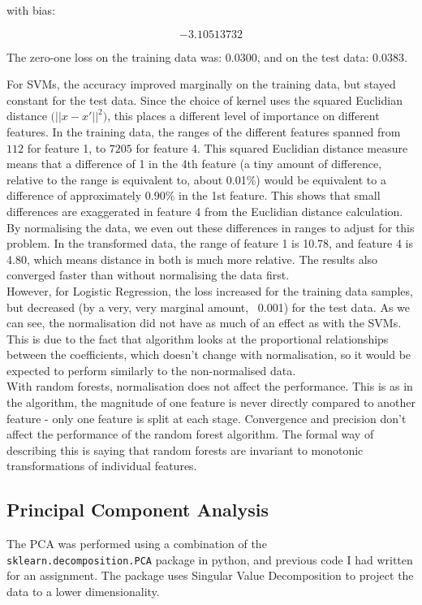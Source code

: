 \documentclass{scrartcl}
\begin{document}
with bias:

\[ -3.10513732 \]

The zero-one loss on the training data was: $0.0300$, and on the test data: $0.0383$.

For SVMs, the accuracy improved marginally on the training data, but stayed constant for the test data. Since the choice of kernel uses the squared Euclidian distance $\big( || x - x' || ^2 \big)$, this places a different level of importance on different features. In the training data, the ranges of the different features spanned from $112$ for feature 1, to $7205$ for feature 4. This squared Euclidian distance measure means that a difference of 1 in the 4th feature (a tiny amount of difference, relative to the range is equivalent to, about 0.01\%) would be equivalent to a difference of approximately 0.90\% in the 1st feature. This shows that small differences are exaggerated in feature 4 from the Euclidian distance calculation. By normalising the data, we even out these differences in ranges to adjust for this problem. In the transformed data, the range of feature 1 is 10.78, and feature 4 is 4.80, which means distance in both is much more relative. The results also converged faster than without normalising the data first. \\

However, for Logistic Regression, the loss increased for the training data samples, but decreased (by a very, very marginal amount, ~0.001) for the test data. As we can see, the normalisation did not have as much of an effect as with the SVMs. This is due to the fact that algorithm looks at the proportional relationships between the coefficients, which doesn't change with normalisation, so it would be expected to perform similarly to the non-normalised data. \\

With random forests, normalisation does not affect the performance. This is as in the algorithm, the magnitude of one feature is never directly compared to another feature - only one feature is split at each stage. Convergence and precision don't affect the performance of the random forest algorithm. The formal way of describing this is saying that random forests are invariant to monotonic transformations of individual features. \cite{so:norm}

\subsection{Principal Component Analysis}
The PCA was performed using a combination of the \texttt{sklearn.decomposition.PCA} package in python, and previous code I had written for an assignment. The package uses Singular Value Decomposition to project the data to a lower dimensionality. \\
\end{document}
